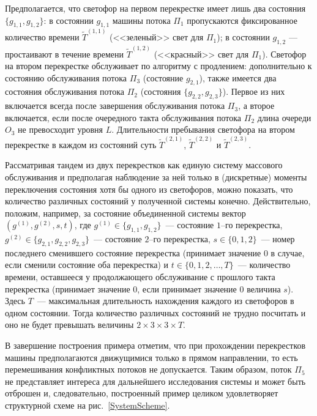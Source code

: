 \documentclass[a4paper,twoside]{article}
\theoremstyle{theorem}
\theoremstyle{remark}
\begin{document}
Предполагается, что светофор на первом перекрестке имеет лишь два состояния $\{g_{1,1},g_{1,2}\}$: в состоянии $g_{1,1}$ машины потока $\Pi_1$ пропускаются фиксированное количество времени $\widetilde T^{(1,1)}$ (<<зеленый>> свет для $\Pi_1$); в состоянии $g_{1,2}$ --- простаивают в течение времени $\widetilde T^{(1,2)}$ (<<красный>> свет для $\Pi_1$). Светофор на втором перекрестке обслуживает по алгоритму с продлением: дополнительно к состоянию обслуживания потока $\Pi_3$ (состояние $g_{2,1}$), также имеется два состояния обслуживания потока $\Pi_2$ (состояния $\{g_{2,2},g_{2,3}\}$). Первое из них включается всегда после завершения обслуживания потока $\Pi_3$, а второе включается, если после очередного такта обслуживания потока $\Pi_2$ длина очереди $O_3$ не превосходит уровня $L$.
Длительности пребывания светофора на втором перекрестке в каждом из состояний суть $\widetilde T^{(2,1)}$, $\widetilde T^{(2,2)}$ и $\widetilde T^{(2,3)}$.


Рассматривая тандем из двух перекрестков как единую систему массового обслуживания и предполагая наблюдение за ней только в (дискретные) моменты переключения состояния хотя бы одного из светофоров, можно показать, что количество различных состояний у полученной системы конечно. Действительно, положим, например, за состояние объединенной системы вектор $(g^{(1)},g^{(2)}, s, t)$, где $g^{(1)}\in \{g_{1,1},g_{1,2}\}$~--- состояние $1$--го перекрестка, $g^{(2)}\in \{g_{2,1},g_{2,2},g_{2,3}\}$~--- состояние $2$--го перекрестка, $s \in \{0, 1, 2\}$~--- номер последнего сменившего состояние перекрестка (принимает значение $0$ в случае, если сменили состояние оба перекрестка) и $t \in \{0, 1, 2, \ldots, T\}$~--- количество времени, оставшееся у продолжающего обслуживание с прошлого такта перекрестка (принимает значение $0$, если принимает значение $0$ величина $s$). Здесь $T$~--- максимальная длительность нахождения каждого из светофоров в одном состоянии. Тогда количество различных состояний не трудно посчитать и оно не будет превышать величины  $2\times 3 \times 3 \times T$.

В завершение построения примера отметим, что при прохождении перекрестков машины предполагаются движущимися только в прямом направлении, то есть перемешивания конфликтных потоков не допускается. Таким образом, поток $\Pi_5$ не представляет интереса для дальнейшего исследования системы и может быть отброшен и, следовательно, построенный пример целиком удовлетворяет структурной схеме на рис.~\ref{SystemScheme}.
\end{document}
